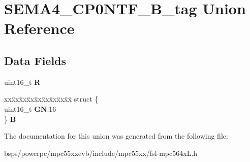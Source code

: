 \hypertarget{unionSEMA4__CP0NTF__16B__tag}{}\section{S\+E\+M\+A4\+\_\+\+C\+P0\+N\+T\+F\+\_\+B\+\_\+tag Union Reference}
\label{unionSEMA4__CP0NTF__16B__tag}
\subsection*{Data Fields}
\begin{DoxyCompactItemize}
\item 
\mbox{\label{unionSEMA4__CP0NTF__16B__tag_a9dd33a4752493251897d2af7f687190a}} 
uint16\+\_\+t {\bfseries R}
\item 
\mbox{\label{unionSEMA4__CP0NTF__16B__tag_ab81701fc63f38e1f4e10d29ce9c5f47f}} 
\begin{tabbing}
xx\=xx\=xx\=xx\=xx\=xx\=xx\=xx\=xx\=\kill
struct \{\\
\>uint16\_t {\bfseries GN}:16\\
\} {\bfseries B}\\

\end{tabbing}\end{DoxyCompactItemize}


The documentation for this union was generated from the following file\+:\begin{DoxyCompactItemize}
\item 
bsps/powerpc/mpc55xxevb/include/mpc55xx/fsl-\/mpc564x\+L.\+h\end{DoxyCompactItemize}
